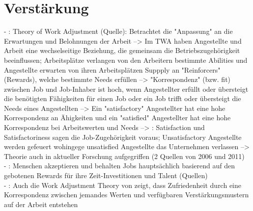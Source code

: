 \section{Verstärkung}
\label{ch:personEnvironmentFit:verstaerkung}
- \cite[S. 3]{su:2015}: Theory of Work Adjustment (Quelle): Betrachtet die "Anpassung" an die Erwartungen und Belohnungen der Arbeit --> Im TWA haben Angestellte und Arbeit eine wechselseitige Beziehung, die gemeinsam die Betriebszugehörigkeit beeinflussen; Arbeitsplätze verlangen von den Arbeitern bestimmte Abilities und Angestellte erwarten von ihren Arbeitsplätzen Suppply an "Reinforcers" (Rewards), welche bestimmte Needs erfüllen --> "Korrespondenz" (bzw. fit) zwischen Job und Job-Inhaber ist hoch, wenn Angestellter erfüllt oder übersteigt die benötigten Fähigkeiten für einen Job oder ein Job trifft oder übersteigt die Needs eines Angestellten --> Ein "satisfactory" Angestellter hat eine hohe Korrespondenz an Ähigkeiten und ein "satisfied" Angestellter hat eine hohe Korrespondenz bei Arbeitswerten und Needs --> \cite[S. 4]{su:2015}: Satisfaction und Satisfactoriness sagen die Job-Zugehörigkeit voraus; Unsatisfactory Angestellte werden gefeuert wohingege unsatisfied Angestellte das Unternehmen verlassen --> Theorie auch in aktueller Forschung aufgegriffen (2 Quellen von 2006 und 2011) \\
- \cite[S. 3]{edwards:2004}: Menschen akzeptieren und behalten Jobs hauptsächlich basierend auf den gebotenen Rewards für ihre Zeit-Investitionen und Talent (Quellen) \\
- \cite[S. 3]{edwards:1990}: Auch die Work Adjustment Theory von \textcite{workAdjustment:1964} zeigt, dass Zufriedenheit durch eine Korrespondenz zwischen jemandes Werten und verfügbaren Verstärkungsmustern auf der Arbeit entstehen \\

